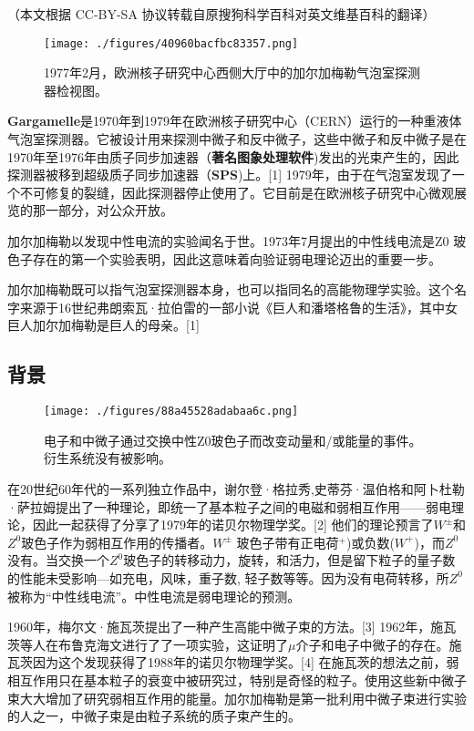 
（本文根据 CC-BY-SA 协议转载自原搜狗科学百科对英文维基百科的翻译）

\begin{figure}[ht]
\centering
\texttt{[image: ./figures/40960bacfbc83357.png]}
\caption{1977年2月，欧洲核子研究中心西侧大厅中的加尔加梅勒气泡室探测器检视图。} \label{fig_JRJML_7}
\end{figure}
\textbf{Gargamelle}是1970年到1979年在欧洲核子研究中心（CERN）运行的一种重液体气泡室探测器。它被设计用来探测中微子和反中微子，这些中微子和反中微子是在1970年至1976年由质子同步加速器（\textbf{著名图象处理软件})发出的光束产生的，因此探测器被移到超级质子同步加速器（\textbf{SPS})上。[1] 1979年，由于在气泡室发现了一个不可修复的裂缝，因此探测器停止使用了。它目前是在欧洲核子研究中心微观展览的那一部分，对公众开放。

加尔加梅勒以发现中性电流的实验闻名于世。1973年7月提出的中性线电流是Z0 玻色子存在的第一个实验表明，因此这意味着向验证弱电理论迈出的重要一步。

加尔加梅勒既可以指气泡室探测器本身，也可以指同名的高能物理学实验。这个名字来源于16世纪弗朗索瓦·拉伯雷的一部小说《巨人和潘塔格鲁的生活》，其中女巨人加尔加梅勒是巨人的母亲。[1]

\subsection{背景}
\begin{figure}[ht]
\centering
\texttt{[image: ./figures/88a45528adabaa6c.png]}
\caption{电子和中微子通过交换中性Z0玻色子而改变动量和/或能量的事件。衍生系统没有被影响。} \label{fig_JRJML_1}
\end{figure}
在20世纪60年代的一系列独立作品中，谢尔登·格拉秀,史蒂芬·温伯格和阿卜杜勒·萨拉姆提出了一种理论，即统一了基本粒子之间的电磁和弱相互作用——弱电理论，因此一起获得了分享了1979年的诺贝尔物理学奖。[2] 他们的理论预言了$W^\pm$和$Z^0$玻色子作为弱相互作用的传播者。$W^\pm$ 玻色子带有正电荷$^+$)或负数($W^+$)，而$Z^0$没有。当交换一个$Z^0$玻色子的转移动力，旋转，和活力，但是留下粒子的量子数的性能未受影响—如充电，风味，重子数, 轻子数等等。因为没有电荷转移，所$Z^0$被称为“中性线电流”。中性电流是弱电理论的预测。

1960年，梅尔文·施瓦茨提出了一种产生高能中微子束的方法。[3] 1962年，施瓦茨等人在布鲁克海文进行了了一项实验，这证明了$\mu$介子和电子中微子的存在。施瓦茨因为这个发现获得了1988年的诺贝尔物理学奖。[4] 在施瓦茨的想法之前，弱相互作用只在基本粒子的衰变中被研究过，特别是奇怪的粒子。使用这些新中微子束大大增加了研究弱相互作用的能量。加尔加梅勒是第一批利用中微子束进行实验的人之一，中微子束是由粒子系统的质子束产生的。

